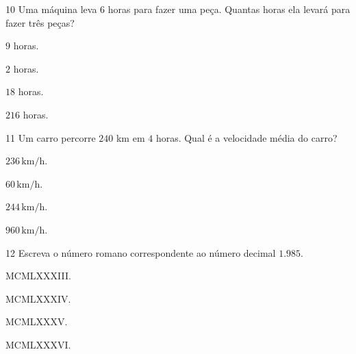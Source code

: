 \pagebreak
\num{10} Uma máquina leva $6$ horas para fazer uma peça. Quantas horas ela
levará para fazer três peças?

\begin{escolha}
\item $9$ horas.
\item $2$ horas.
\item $18$ horas.
\item $216$ horas.
\end{escolha}



\num{11} Um carro percorre $240$ km em $4$ horas. Qual é a velocidade média do
carro?

\begin{escolha}
\item $236\,\text{km/h}$.
\item $60\,\text{km/h}$.
\item $244\,\text{km/h}$.
\item $960\,\text{km/h}$.
\end{escolha}



\num{12} Escreva o número romano correspondente ao número decimal $1.985$.

\begin{escolha}
\item MCMLXXXIII.
\item MCMLXXXIV.
\item MCMLXXXV.
\item MCMLXXXVI.
\end{escolha}

